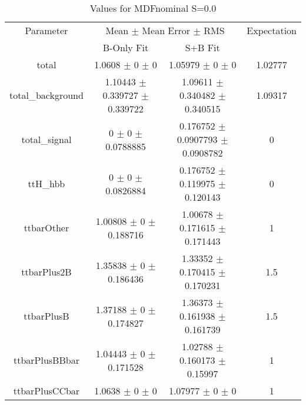 \begin{table}
\centering
\caption{Values for MDFnominal S=0.0}
\begin{tabular}{cccc}
\toprule
Parameter & \multicolumn{2}{c}{Mean $\pm$ Mean Error $\pm$ RMS} & Expectation\\
 & B-Only Fit & S+B Fit & \\
\midrule
total & \num{1.0608} $\pm$ \num{0} $\pm$ \num{0} & \num{1.05979} $\pm$ \num{0} $\pm$ \num{0} & \num{1.02777}\\
total\_background & \num{1.10443} $\pm$ \num{0.339727} $\pm$ \num{0.339722} & \num{1.09611} $\pm$ \num{0.340482} $\pm$ \num{0.340515} & \num{1.09317}\\
total\_signal & \num{0} $\pm$ \num{0} $\pm$ \num{0.0788885} & \num{0.176752} $\pm$ \num{0.0907793} $\pm$ \num{0.0908782} & \num{0}\\
ttH\_hbb & \num{0} $\pm$ \num{0} $\pm$ \num{0.0826884} & \num{0.176752} $\pm$ \num{0.119975} $\pm$ \num{0.120143} & \num{0}\\
ttbarOther & \num{1.00808} $\pm$ \num{0} $\pm$ \num{0.188716} & \num{1.00678} $\pm$ \num{0.171615} $\pm$ \num{0.171443} & \num{1}\\
ttbarPlus2B & \num{1.35838} $\pm$ \num{0} $\pm$ \num{0.186436} & \num{1.33352} $\pm$ \num{0.170415} $\pm$ \num{0.170231} & \num{1.5}\\
ttbarPlusB & \num{1.37188} $\pm$ \num{0} $\pm$ \num{0.174827} & \num{1.36373} $\pm$ \num{0.161938} $\pm$ \num{0.161739} & \num{1.5}\\
ttbarPlusBBbar & \num{1.04443} $\pm$ \num{0} $\pm$ \num{0.171528} & \num{1.02788} $\pm$ \num{0.160173} $\pm$ \num{0.15997} & \num{1}\\
ttbarPlusCCbar & \num{1.0638} $\pm$ \num{0} $\pm$ \num{0} & \num{1.07977} $\pm$ \num{0} $\pm$ \num{0} & \num{1}\\
\bottomrule
\end{tabular}
\end{table}